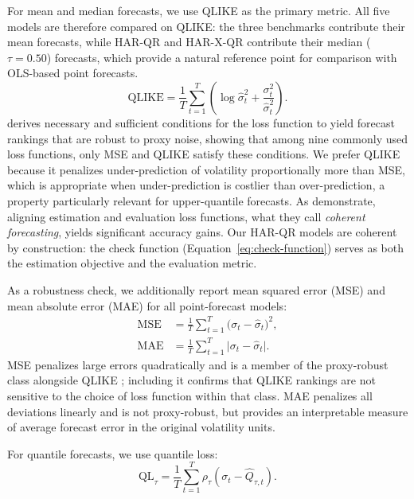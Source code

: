 For mean and median forecasts, we use QLIKE as the primary metric. All five models are therefore compared on QLIKE: the three benchmarks contribute their mean forecasts, while HAR-QR and HAR-X-QR contribute their median ($\tau = 0.50$) forecasts, which provide a natural reference point for comparison with OLS-based point forecasts.
\begin{equation}
\label{eq:qlike}
\text{QLIKE} = \frac{1}{T} \sum_{t=1}^{T} \left( \log \hat{\sigma}_t^2 + \frac{\sigma_t^2}{\hat{\sigma}_t^2} \right).
\end{equation}
\textcite{pattonVolatilityForecastComparison} derives necessary and
sufficient conditions for the loss function to yield forecast rankings that
are robust to proxy noise, showing that among nine commonly used loss
functions, only MSE and QLIKE satisfy these conditions. We prefer QLIKE
because it penalizes under-prediction of volatility proportionally more than
MSE, which is appropriate when under-prediction is costlier than
over-prediction, a property particularly relevant for upper-quantile
forecasts. As \textcite{pukeCoherentForecastingRealized2026} demonstrate,
aligning estimation and evaluation loss functions, what they call
\emph{coherent forecasting}, yields significant accuracy gains. Our HAR-QR
models are coherent by construction: the check function
(Equation~\ref{eq:check-function}) serves as both the estimation objective
and the evaluation metric.

As a robustness check, we additionally report mean squared error (MSE) and
mean absolute error (MAE) for all point-forecast models:
\begin{align}
\text{MSE} &= \frac{1}{T} \sum_{t=1}^{T} \bigl(\sigma_t - \hat{\sigma}_t\bigr)^2,
\label{eq:mse} \\
\text{MAE} &= \frac{1}{T} \sum_{t=1}^{T} \bigl|\sigma_t - \hat{\sigma}_t\bigr|.
\label{eq:mae}
\end{align}
MSE penalizes large errors quadratically and is a member of the
proxy-robust class alongside QLIKE \parencite{pattonVolatilityForecastComparison};
including it confirms that QLIKE rankings are not sensitive to the choice of
loss function within that class. MAE penalizes all deviations linearly and is
not proxy-robust, but provides an interpretable measure of average forecast
error in the original volatility units.

For quantile forecasts, we use quantile loss:
\begin{equation}
\label{eq:quantile-loss}
\text{QL}_{\tau} = \frac{1}{T} \sum_{t=1}^{T} \rho_{\tau}(\sigma_t - \hat{Q}_{\tau,t}).
\end{equation}

